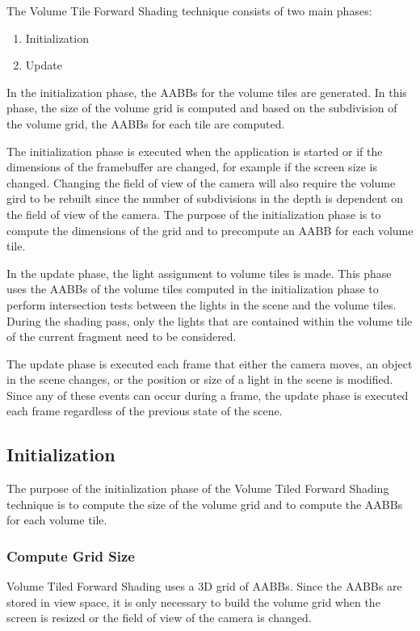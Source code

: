 The Volume Tile Forward Shading technique consists of two main phases:

\begin{enumerate}
\item{Initialization}
\item{Update}
\end{enumerate}

In the initialization phase, the AABBs for the volume tiles are generated. In this phase, the size of the volume grid is computed and based on the subdivision of the volume grid, the AABBs for each tile are computed.

The initialization phase is executed when the application is started or if the dimensions of the framebuffer are changed, for example if the screen size is changed. Changing the field of view of the camera will also require the volume gird to be rebuilt since the number of subdivisions in the depth is dependent on the field of view of the camera. The purpose of the initialization phase is to compute the dimensions of the grid and to precompute an AABB for each volume tile.

In the update phase, the light assignment to volume tiles is made. This phase uses the AABBs of the volume tiles computed in the initialization phase to perform intersection tests between the lights in the scene and the volume tiles. During the shading pass, only the lights that are contained within the volume tile of the current fragment need to be considered.

The update phase is executed each frame that either the camera moves, an object in the scene changes, or the position or size of a light in the scene is modified. Since any of these events can occur during a frame, the update phase is executed each frame regardless of the previous state of the scene.

\subsection{Initialization}

The purpose of the initialization phase of the Volume Tiled Forward Shading technique is to compute the size of the volume grid and to compute the AABBs for each volume tile.

\subsubsection{Compute Grid Size}

Volume Tiled Forward Shading uses a 3D grid of AABBs. Since the AABBs are stored in view space, it is only necessary to build the volume grid when the screen is resized or the field of view of the camera is changed.


